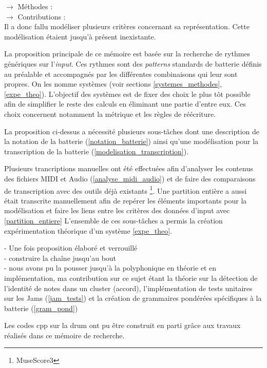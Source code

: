 $\to$ Méthodes :\\
$\to$ Contributions :\\
Il a donc fallu modéliser plusieurs critères concernant sa
représentation. Cette modélisation étaient jusqu’à présent inexistante.

La proposition principale de ce mémoire est basée sur la recherche de rythmes
génériques sur l’\textit{input}. Ces rythmes sont des \textit{patterns}
standards de batterie définis au préalable et accompagnés par les différentes
combinaisons qui leur sont propres. On les nomme systèmes (voir sections
\ref{systemes_methodes}, \ref{expe_theo}). L’objectif des systèmes est de fixer
des choix le plus tôt possible afin de simplifier le reste des calculs en
éliminant une partie d’entre eux. Ces choix concernent notamment la métrique
et les règles de réécriture.




La proposition ci-dessus a nécessité plusieurs sous-tâches dont une description
de la notation de la batterie (\ref{notation_batterie}) ainsi qu’une
modélisation pour la transcription de la batterie
(\ref{modelisation_transcription}).

Plusieurs trancriptions manuelles ont été effectuées afin d’analyser les
contenus des fichiers MIDI et Audio (\ref{analyse_midi_audio}) et de faire des
comparaisons de transcription avec des outils déjà existants
\footnote{MuseScore3}. Une partition entière a aussi était transcrite
manuellement afin de repérer les éléments importants pour la modélisation et
faire les liens entre les critères des données d’input avec \ref{partition_entiere}
L’ensemble de ces sous-tâches a permis la création expérimentation théorique
d’un système \ref{expe_theo}.

- Une fois proposition élaboré et verrouillé\\
- construire la chaîne jusqu’au bout\\
- nous avons pu la pousser jusqu’à la polyphonique en théorie et en
implémentation, ma contribution sur ce sujet étant la théorie sur la détection
de l’identité de notes dans un cluster (accord), l’implémentation de tests
unitaires sur les Jams (\ref{jam_tests}) et la création de grammaires pondérées
spécifiques à la batterie (\ref{gram_pond})


Les codes cpp sur la drum ont pu être construit en parti grâce aux travaux
réalisés dans ce mémoire de recherche.\\

